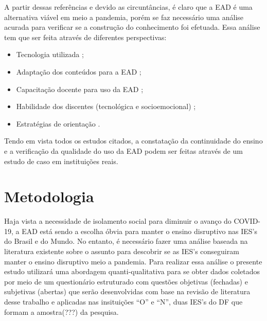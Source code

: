 \documentclass[
	arial,
	12pt,				%
	openright,			%
	oneside,
	a4paper,			%
	chapter=TITLE,		%
	english,			%
	french,				%
	spanish,			%
	brazil,				%
	]{abntex2}
\begin{document}
A partir dessas referências e devido as circuntâncias, é claro que a EAD é uma alternativa viável em meio a pandemia, porém se faz necessário uma análise acurada para verificar se a construção do conhecimento foi efetuada. Essa análise tem que ser feita através de diferentes perspectivas:

 \begin{itemize}

  \item Tecnologia utilizada \cite{benakouche2000educaccao, almeida2003educaccao, georgia};
  \item Adaptação dos conteúdos para a EAD \cite{xie2020autonomous, zhou2020school, benakouche2000educaccao};
  \item Capacitação docente para uso da EAD \cite{benakouche2000educaccao};
  \item Habilidade dos discentes (tecnológica e socioemocional) \cite{oranburg2020distance, arieira2009avaliaccao};
  \item Estratégias de orientação \cite{xie2020autonomous, reich2020remote, zhou2020school}.

\end{itemize}

Tendo em vista todos os estudos citados, a constatação da continuidade do ensino e a verificação da qualidade do uso da EAD podem ser feitas através de um estudo de caso em instituições reais.


\chapter{Metodologia}

Haja vista a necessidade de isolamento social para diminuir o avanço do COVID-19, a EAD está sendo a escolha óbvia para manter o ensino disruptivo nas IES's do Brasil e do Mundo. No entanto, é necessário fazer uma análise baseada na literatura existente sobre o assunto para descobrir se as IES's conseguiram manter o ensino disruptivo meio a pandemia. Para realizar essa análise o presente estudo utilizará uma abordagem quanti-qualitativa   \cite{elielCruz} para se obter dados coletados por meio de um questionário estruturado com questões objetivas (fechadas) e subjetivas (abertas) que serão desenvolvidas com base na revisão de literatura desse trabalho e aplicadas nas insituições ``O'' e ``N'', duas IES's do DF que formam a amostra(???) da pesquisa.
\end{document}
